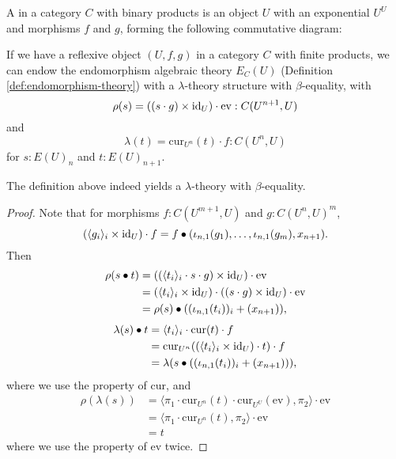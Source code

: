 \begin{definition}
  A  in a category $ C $ with binary products is an object $ U $ with an exponential $ U^U $ and morphisms $ f $ and $ g $, forming the following commutative diagram:
  \begin{center}
  \end{center}
\end{definition}

\begin{definition}
  If we have a reflexive object $ (U, f, g) $ in a category $ C $ with finite products, we can endow the endomorphism algebraic theory $ E_C(U) $ (Definition \ref{def:endomorphism-theory}) with a $ \lambda $-theory structure with $ \beta $-equality, with
  \[ \rho(s) = ((s \cdot g) \times \text{id}_{U}) \cdot \mathrm{ev} : C(U^{n + 1}, U) \]
  and
  \[ \lambda(t) = \mathrm{cur}_{U^n}(t) \cdot f : C(U^n, U) \]
  for $ s: E(U)_n $ and $ t: E(U)_{n + 1} $.
\end{definition}

\begin{lemma}
  The definition above indeed yields a $ \lambda $-theory with $ \beta $-equality.
\end{lemma}
\begin{proof}
  Note that for morphisms $ f: C(U^{m + 1}, U) $ and $ g: C(U^n, U)^m $,
  \[ (\langle g_i \rangle_i \times \text{id}_{U}) \cdot f = f \bullet (\iota_{n, 1}(g_1), \dots, \iota_{n, 1}(g_m), x_{n + 1}). \]
  Then
  \begin{align*}
    \rho(s \bullet t)
    &= ((\langle t_i \rangle_i \cdot s \cdot g) \times \text{id}_{U}) \cdot \mathrm{ev}\\
    &= (\langle t_i \rangle_i \times \text{id}_{U}) \cdot ((s \cdot g) \times \text{id}_{U}) \cdot \mathrm{ev}\\
    &= \rho(s) \bullet ((\iota_{n, 1}(t_i))_i + (x_{n + 1})),
  \end{align*}
  \begin{align*}
    \lambda(s) \bullet t
    &= \langle t_i \rangle_i \cdot \mathrm{cur}(t) \cdot f\\
    &= \mathrm{cur}_{U^n}((\langle t_i \rangle_i \times \text{id}_{U}) \cdot t) \cdot f\\
    &= \lambda(s \bullet ((\iota_{n, 1}(t_i))_i + (x_{n + 1}))),
  \end{align*}
  where we use the property of $ \mathrm{cur} $, and
  \begin{align*}
    \rho(\lambda(s))
    &= \langle \pi_1 \cdot \mathrm{cur}_{U^n}(t) \cdot \mathrm{cur}_{U^U}(\mathrm{ev}), \pi_2 \rangle \cdot \mathrm{ev}\\
    &= \langle \pi_1 \cdot \mathrm{cur}_{U^n}(t), \pi_2 \rangle \cdot \mathrm{ev}\\
    &= t
  \end{align*}
  where we use the property of $ \mathrm{ev} $ twice.
\end{proof}

